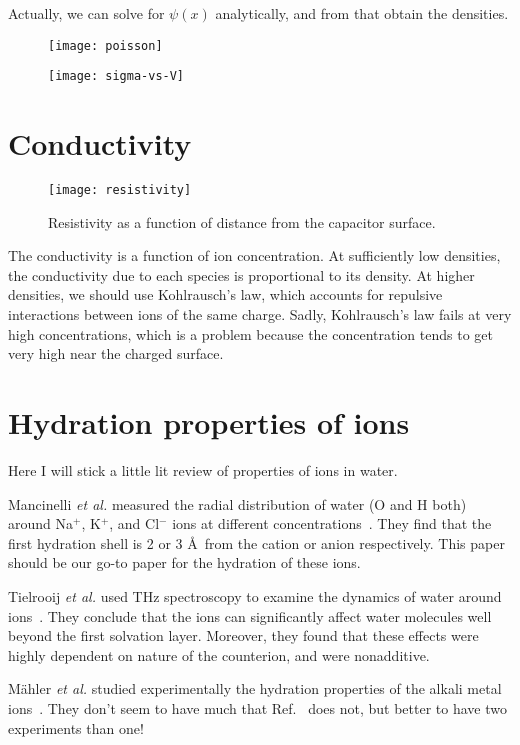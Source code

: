 \documentclass[twocolumn]{revtex4-1}
\begin{document}
Actually, we can solve for $\psi(x)$ analytically, and from that
obtain the densities.

\begin{figure}
  \texttt{[image: poisson]}
\end{figure}

\begin{figure}
  \texttt{[image: sigma-vs-V]}
\end{figure}

\section{Conductivity}

\begin{figure}
  \texttt{[image: resistivity]}
  \caption{Resistivity as a function of distance from the capacitor
    surface.}
\end{figure}

The conductivity is a function of ion concentration.  At sufficiently
low densities, the conductivity due to each species is proportional to
its density.  At higher densities, we should use Kohlrausch's law,
which accounts for repulsive interactions between ions of the same
charge.  Sadly, Kohlrausch's law fails at very high concentrations,
which is a problem because the concentration tends to get very high
near the charged surface.

\section{Hydration properties of ions}
Here I will stick a little lit review of properties of ions in water.

Mancinelli \emph{et al.} measured the radial distribution of water (O
and H both) around Na$^+$, K$^+$, and Cl$^-$ ions at different
concentrations~\cite{mancinelli2007hydration}.  They find that the
first hydration shell is 2 or 3 \AA\ from the cation or anion
respectively.  This paper should be our go-to paper for the hydration
of these ions.

Tielrooij \emph{et al.} used THz spectroscopy to examine the dynamics
of water around ions~\cite{tielrooij2010cooperativity}.  They conclude
that the ions can significantly affect water molecules well beyond the
first solvation layer.  Moreover, they found that these effects were
highly dependent on nature of the counterion, and were nonadditive.

M\"ahler \emph{et al.} studied experimentally the hydration properties
of the alkali metal ions~\cite{mahler2011study}.  They don't seem to
have much that Ref.~ does not, but
better to have two experiments than one!
\end{document}
